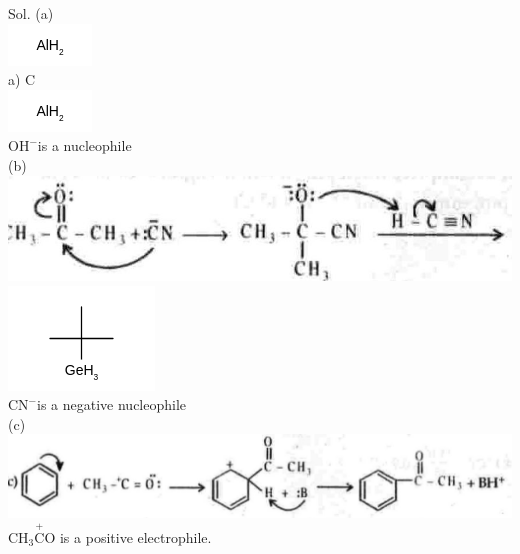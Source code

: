 \documentclass[10pt]{article}
\begin{document}
Sol. (a)\\
\includegraphics{smile-c1a1af6e082aadbffd38120a6af9f0278aae949d}\\
a) C\\
\includegraphics{smile-d0fc19ea7a609f728f40570006bb0b0a3da501f6}\\
$\mathrm{OH}^{-}$is a nucleophile\\
(b)\\
\includegraphics[max width=\textwidth, center]{2025_01_28_8470952b98110cec3aabg-130(4)}\\
\includegraphics{smile-52e073251cd5f8a08a24d81ea0adcf6b198438f6}\\
$\mathrm{CN}^{-}$is a negative nucleophile\\
(c)\\
\includegraphics[max width=\textwidth, center]{2025_01_28_8470952b98110cec3aabg-130(2)}\\
$\mathrm{CH}_{3} \stackrel{+}{\mathrm{C}} \mathrm{O}$ is a positive electrophile.
\end{document}
